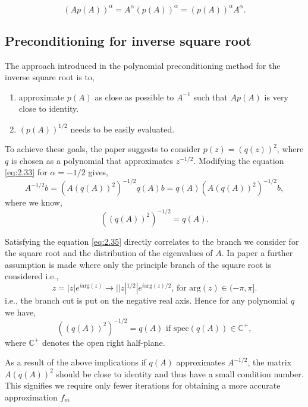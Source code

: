 \begin{equation}
    (Ap(A))^\alpha = A^\alpha (p(A))^\alpha = (p(A))^\alpha A^\alpha.
    \label{eq:2.33}
\end{equation}

\subsection{Preconditioning for inverse square root}
\label{sec:pre_cond_inv_sqrt}

The approach introduced in the polynomial preconditioning method for the inverse square root is to,
\begin{enumerate}
    \item approximate $p(A)$ as close as possible to $A^{-1}$ such that $Ap(A)$ is very close to identity.
    \item $(p(A))^{1/2}$ needs to be easily evaluated.
\end{enumerate}

To achieve these goals, the paper \cite{49} suggests to consider $p(z) = (q(z))^{2}$, where $q$ is chosen as a polynomial that approximates $z^{-1/2}$. Modifying the equation \eqref{eq:2.33} for $\alpha = -1/2$ gives,
\begin{equation}
    A^{-1/2}b = (A(q(A))^{2})^{-1/2}q(A)b = q(A)(A(q(A))^{2})^{-1/2}b,
    \label{eq:2.34}
\end{equation}
where we know,
\begin{equation}
    ((q(A))^{2})^{-1/2} = q(A).
    \label{eq:2.35}
\end{equation}

Satisfying the equation \eqref{eq:2.35} directly correlates to the branch we consider for the square root and the distribution of the eigenvalues of $A$. In paper \cite{49} a further assumption is made where only the principle branch of the square root is considered i.e.,
\[
    z = |z| e^{i \text{arg}(z)} \rightarrow ||z|^{1/2}| e^{i\text{arg}(z)/2} \text{, for } \text{arg}(z) \in (-\pi, \pi].
\]
i.e., the branch cut is put on the negative real axis. Hence for any polynomial $q$ we have,
\begin{equation}
    ((q(A))^{2})^{-1/2} = q(A) \text{ if spec}(q(A)) \in \mathbb{C}^{+},
    \label{eq:2.36}
\end{equation}
where $\mathbb{C}^{+}$ denotes  the open right half-plane.

As a result of the above implications if $q(A)$ approximates $A^{-1/2}$, the matrix $A(q(A))^{2}$ should be close to identity and thus have a small condition number. This signifies we require only fewer iterations for obtaining a more accurate approximation $f_{m}$

